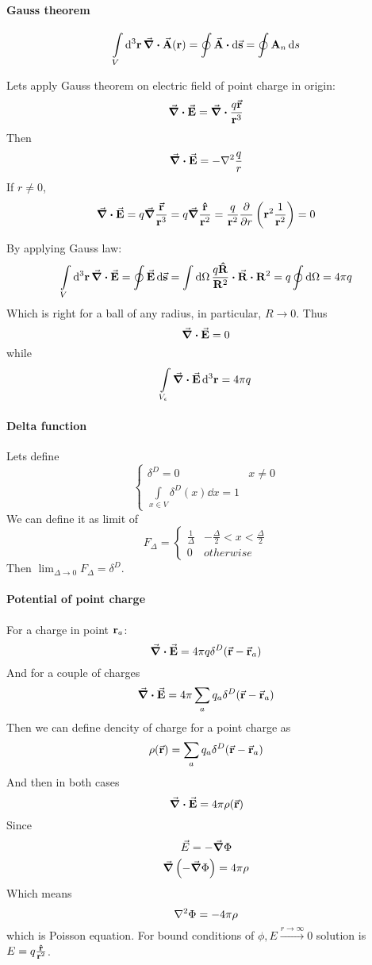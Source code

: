 \paragraph{Gauss theorem}
$$\int\limits_V \dd[3]{\vb{r}}\div {\va{A} \qty(\vb{r})} = \oint \va{A} \vdot \dd{\va{s}} = \oint \vb{A}_n \dd{s}$$

Lets apply Gauss theorem on electric field of point charge in origin:
$$\div{\va{E}} = \div{ \frac{q \va{r}}{\vb{r}^3}}$$
Then
$$\div{\va{E}} = -\laplacian{\frac{q}{r}} $$
If $r\neq 0$,
$$\div{\va{E}} = q \grad {\frac{\va{r}}{\vb{r}^3}} = q \grad {\frac{\vu{r}}{\vb{r}^2} }= \frac{q}{\vb{r}^2} \pdv{r} \left( \vb{r}^2 \frac{1}{\vb{r}^2}\right) = 0 $$

By applying Gauss law:
$$\int\limits_V \dd[3]{\vb{r}} \div{\va{E}} = \oint \va{E} \dd{\va{s}} = \int \dd{\Omega}  \frac{q\vu{R}}{\vb{R}^2} \vdot \va{R} \vdot \vb{R}^2 = q\oint \dd{\Omega}  = 4\pi q$$
Which is right for a ball of any radius, in particular,  $R \to 0$. Thus
$$\div{\va{E}} = 0$$
while
$$\int\limits_{V_\epsilon} \div{\va{E}} \dd[3]{\vb{r}}= 4\pi q$$ 
\paragraph{Delta function}
Lets define 
$$ \begin{cases}
\delta^D = 0 & x\neq0\\
\int\limits_{x\in V} \delta^D(x) \dd{x} = 1
\end{cases}$$
We can define it as limit of 
$$F_\Delta = \begin{cases}
\frac{1}{\Delta} & -\frac{\Delta}{2} < x<  \frac{\Delta}{2}  \\
0 & otherwise
\end{cases}$$
Then $\lim_{\Delta\to 0} F_\Delta = \delta^D$.
\paragraph{Potential of point charge}
For a charge in point $\vb{r}_a$:
$$\div{\va{E}} = 4\pi q \delta^D \qty(\va{r} - \va{r}_a)$$
And for a couple of charges
$$\div{\va{E}} = 4\pi \sum_a q_a \delta^D \qty(\va{r} - \va{r}_a)$$
Then we can define dencity of charge for a point charge as
$$\rho\qty(\va{r}) =  \sum_a q_a \delta^D \qty(\va{r} - \va{r}_a)$$
And then in both cases
$$\div{\va{E}} = 4\pi \rho \qty(\va{r})$$
Since
$$\vec{E} = -\grad {\Phi}$$
$$\grad{ \left(-\grad{ \Phi}\right) }= 4\pi \rho$$
Which means
$$\laplacian{\Phi} = -4\pi \rho$$
which is Poisson equation. For bound conditions of $\phi, E \stackrel{r \to \infty}{\to} 0$ solution is $E = q\frac{\vu{r}}{\vb{r}^2}$.
